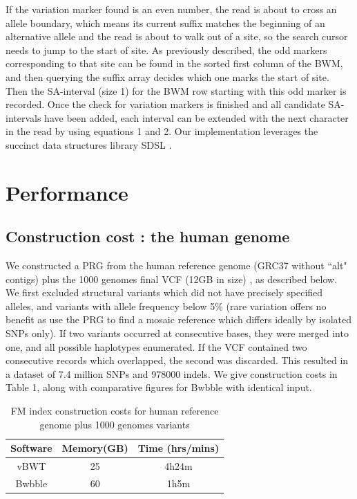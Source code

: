 \documentclass[runningheads,a4paper]{llncs}
\begin{document}
If the variation marker found is an even number, the read is about to cross an allele boundary, which means its current suffix matches the beginning of an alternative allele and the read is about to walk out of a site, so the search cursor needs to jump to the start of site. As previously described, the odd markers corresponding to that site can be found in the sorted first column of the BWM, and then querying the suffix array decides which one marks the start of site. Then the SA-interval (size 1) for the BWM row starting with this odd marker is recorded.
Once the check for variation markers is finished and all candidate SA-intervals have been added, each interval can be extended with the next character in the read by using equations 1 and 2. Our implementation leverages the succinct data structures library SDSL \cite{gog}.




\section{Performance}
\subsection{Construction cost : the human genome}
We   constructed a PRG from the human reference genome (GRC37 without ``alt" contigs) plus the 1000 genomes final VCF (12GB in size) \cite{1000g}, as described below. We first  excluded structural variants which did not have precisely specified alleles, and variants with allele frequency below 5\% (rare variation offers no benefit as use the PRG to find a mosaic reference which differs ideally by isolated SNPs only). If two variants occurred at consecutive bases, they were merged into one, and all possible haplotypes enumerated. If the VCF contained two consecutive records which overlapped, the second was discarded. This resulted in a dataset of 7.4 million SNPs and 978000 indels. We give construction costs in Table 1, along with comparative figures for Bwbble with identical input. 
 
\begin{table}
\caption{FM index construction costs for human reference genome plus 1000 genomes variants}
\centering
\begin{tabular}{c c c}
\hline
Software  & Memory(GB) & Time (hrs/mins)\\
\hline
vBWT  & 25  & 4h24m \\
Bwbble  & 60 &  1h5m \\ 
\hline
\end{tabular}
\end{table}
\end{document}
